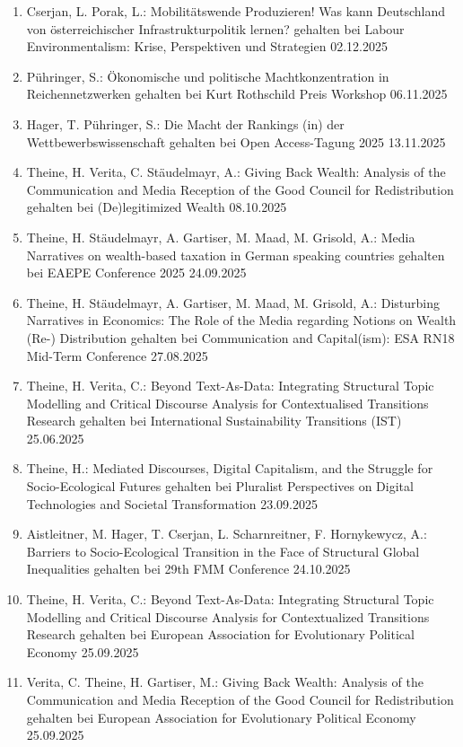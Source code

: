 \begin{enumerate}
	\item Cserjan, L. Porak, L.: Mobilitätswende Produzieren! Was kann Deutschland von österreichischer Infrastrukturpolitik lernen? gehalten bei Labour Environmentalism: Krise, Perspektiven und Strategien 02.12.2025
	\item Pühringer, S.: Ökonomische und politische Machtkonzentration in Reichennetzwerken gehalten bei Kurt Rothschild Preis Workshop 06.11.2025
	\item Hager, T. Pühringer, S.: Die Macht der Rankings (in) der Wettbewerbswissenschaft gehalten bei Open Access-Tagung 2025 13.11.2025
	\item Theine, H. Verita, C. Stäudelmayr, A.: Giving Back Wealth: Analysis of the Communication and Media Reception of the \glqq Good Council for Redistribution\grqq{} gehalten bei (De)legitimized Wealth 08.10.2025
	\item Theine, H. Stäudelmayr, A. Gartiser, M. Maad, M. Grisold, A.: Media Narratives on wealth-based taxation in German speaking countries gehalten bei EAEPE Conference 2025 24.09.2025
	\item Theine, H.  Stäudelmayr, A. Gartiser, M. Maad, M.  Grisold, A.: \glqq Disturbing Narratives in Economics: The Role of the Media regarding Notions on Wealth (Re-) Distribution\grqq{} gehalten bei Communication and Capital(ism): ESA RN18 Mid-Term Conference 27.08.2025
	\item Theine, H. Verita, C.: Beyond Text-As-Data: Integrating Structural Topic Modelling and Critical Discourse Analysis for Contextualised Transitions Research gehalten bei International Sustainability Transitions (IST) 25.06.2025
	\item Theine, H.: Mediated Discourses, Digital Capitalism, and the Struggle for Socio-Ecological Futures gehalten bei Pluralist Perspectives on Digital Technologies and Societal Transformation 23.09.2025
	\item Aistleitner, M. Hager, T. Cserjan, L. Scharnreitner, F. Hornykewycz, A.: Barriers to Socio-Ecological Transition in the Face of Structural Global Inequalities gehalten bei 29th FMM Conference 24.10.2025
	\item Theine, H. Verita, C.: Beyond Text-As-Data: Integrating Structural Topic Modelling and Critical Discourse Analysis for Contextualized Transitions Research gehalten bei European Association for Evolutionary Political Economy 25.09.2025
	\item Verita, C. Theine, H. Gartiser, M.: Giving Back Wealth: Analysis of the Communication and Media Reception of the \glqq Good Council for Redistribution\grqq{} gehalten bei European Association for Evolutionary Political Economy 25.09.2025

\end{enumerate}
